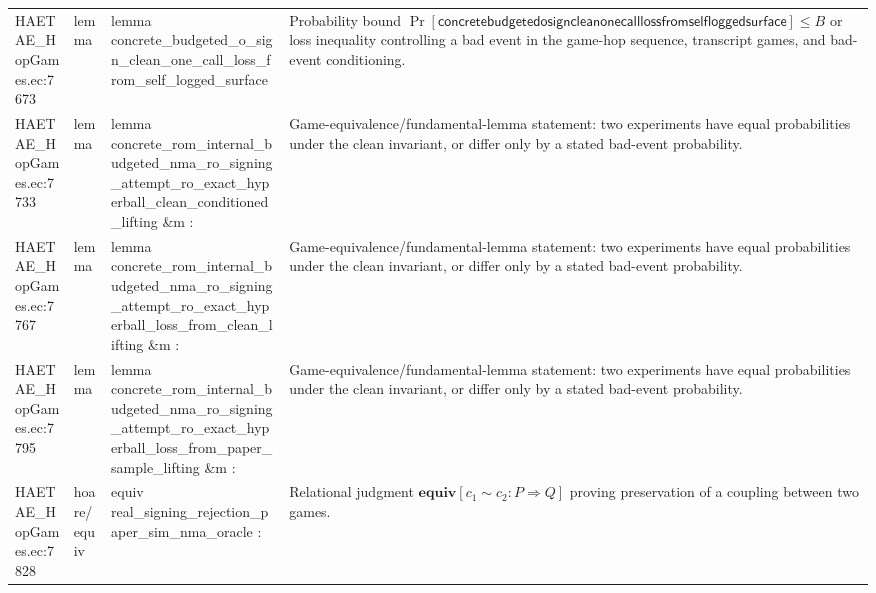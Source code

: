 \documentclass[10pt]{article}
\begin{document}
\begin{longtable}{L{0.11\textwidth}L{0.055\textwidth}L{0.385\textwidth}L{0.41\textwidth}}
HAETAE\_\allowbreak{}HopGames.\allowbreak{}ec:\allowbreak{}7673 & lemma & {\ttfamily\scriptsize lemma concrete\_\allowbreak{}budgeted\_\allowbreak{}o\_\allowbreak{}sign\_\allowbreak{}clean\_\allowbreak{}one\_\allowbreak{}call\_\allowbreak{}loss\_\allowbreak{}from\_\allowbreak{}self\_\allowbreak{}logged\_\allowbreak{}surface} & Probability bound $\Pr[\mathsf{concretebudgetedosigncleanonecalllossfromselfloggedsurface}]\le B$ or loss inequality controlling a bad event in the game-hop sequence, transcript games, and bad-event conditioning. \\
HAETAE\_\allowbreak{}HopGames.\allowbreak{}ec:\allowbreak{}7733 & lemma & {\ttfamily\scriptsize lemma concrete\_\allowbreak{}rom\_\allowbreak{}internal\_\allowbreak{}budgeted\_\allowbreak{}nma\_\allowbreak{}ro\_\allowbreak{}signing\_\allowbreak{}attempt\_\allowbreak{}ro\_\allowbreak{}exact\_\allowbreak{}hyperball\_\allowbreak{}clean\_\allowbreak{}conditioned\_\allowbreak{}lifting \&m :} & Game-equivalence/fundamental-lemma statement: two experiments have equal probabilities under the clean invariant, or differ only by a stated bad-event probability. \\
HAETAE\_\allowbreak{}HopGames.\allowbreak{}ec:\allowbreak{}7767 & lemma & {\ttfamily\scriptsize lemma concrete\_\allowbreak{}rom\_\allowbreak{}internal\_\allowbreak{}budgeted\_\allowbreak{}nma\_\allowbreak{}ro\_\allowbreak{}signing\_\allowbreak{}attempt\_\allowbreak{}ro\_\allowbreak{}exact\_\allowbreak{}hyperball\_\allowbreak{}loss\_\allowbreak{}from\_\allowbreak{}clean\_\allowbreak{}lifting \&m :} & Game-equivalence/fundamental-lemma statement: two experiments have equal probabilities under the clean invariant, or differ only by a stated bad-event probability. \\
HAETAE\_\allowbreak{}HopGames.\allowbreak{}ec:\allowbreak{}7795 & lemma & {\ttfamily\scriptsize lemma concrete\_\allowbreak{}rom\_\allowbreak{}internal\_\allowbreak{}budgeted\_\allowbreak{}nma\_\allowbreak{}ro\_\allowbreak{}signing\_\allowbreak{}attempt\_\allowbreak{}ro\_\allowbreak{}exact\_\allowbreak{}hyperball\_\allowbreak{}loss\_\allowbreak{}from\_\allowbreak{}paper\_\allowbreak{}sample\_\allowbreak{}lifting \&m :} & Game-equivalence/fundamental-lemma statement: two experiments have equal probabilities under the clean invariant, or differ only by a stated bad-event probability. \\
HAETAE\_\allowbreak{}HopGames.\allowbreak{}ec:\allowbreak{}7828 & hoare/equiv & {\ttfamily\scriptsize equiv real\_\allowbreak{}signing\_\allowbreak{}rejection\_\allowbreak{}paper\_\allowbreak{}sim\_\allowbreak{}nma\_\allowbreak{}oracle :} & Relational judgment $\mathbf{equiv}[c_1\sim c_2:P\Rightarrow Q]$ proving preservation of a coupling between two games. \\

\end{longtable}
\end{document}
